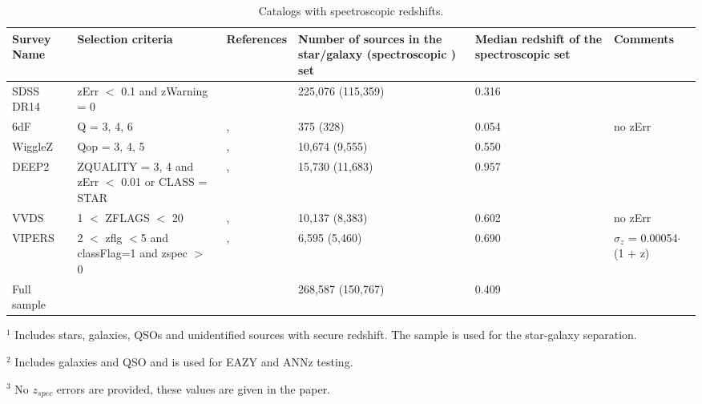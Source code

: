 \documentclass[apj,iop]{emulateapj}
\begin{document}
\begin{table}[t]
  \begin{center}
    \caption{Catalogs with spectroscopic redshifts.}
    \begin{threeparttable}
    \begin{tabular}{|p{1.6cm}|p{3cm}|p{3.5cm}|p{2.9cm}|p{2.5cm}|p{2cm}|}
      \toprule %
      \textbf{Survey Name} & \textbf{Selection criteria} & \textbf{References} &\textbf{Number of sources in the star/galaxy\tnote{1} (spectroscopic\tnote{2} ) set}  &  \textbf{Median redshift of the spectroscopic set} & \textbf{Comments}\\
            \hline
      SDSS DR14 &  zErr $<$ 0.1 and zWarning = 0 & \citet{Bolton2012a} & 225,076 (115,359) & 0.316 &  \\
      6dF & Q = 3, 4, 6 & \citet{Jones2004}, \citet{Jones2009} &  375 (328) & 0.054 & no zErr\\
      WiggleZ & Qop = 3, 4, 5 & \citet[][]{Drinkwater2010}, \citet[][]{Parkinson2012a} &  10,674 (9,555) &0.550 &\\
      DEEP2 & ZQUALITY = 3, 4 and zErr $<$ 0.01 or CLASS = STAR & \citet[][]{Davis2003c}, \citet[][]{Newman2013} & 15,730 (11,683) &  0.957 &\\
      VVDS & 1 $<$ ZFLAGS $<$ 20 & \citet[][]{LeFevre2013}, \citet[][]{Garilli2008} & 10,137 (8,383) &  0.602 & no zErr\\
      VIPERS & 2 $<$ zflg $<$5 and classFlag=1 and zspec $>$ 0 & \citet{Scodeggio2018}, \citet{Guzzo2014} & 6,595 (5,460) & 0.690 & $\sigma_z$ = 0.00054$\cdot$ (1 + z)  \tnote{3}\\
       Full sample &   &  &  268,587 (150,767) & 0.409 &\\
             \hline 
    \end{tabular}
\begin{tablenotes}    
    \item[$^1$] Includes stars, galaxies, QSOs and unidentified sources with secure redshift. The sample is used for the star-galaxy separation.
    \item[$^2$] Includes galaxies and QSO and is used for EAZY and ANNz testing.
    \item[$^3$] No $z_{spec}$ errors are provided, these values are given in the paper.
     \end{tablenotes}
    \end{threeparttable}
      \label{tab:table1}
  \end{center}
\end{table}
\end{document}
